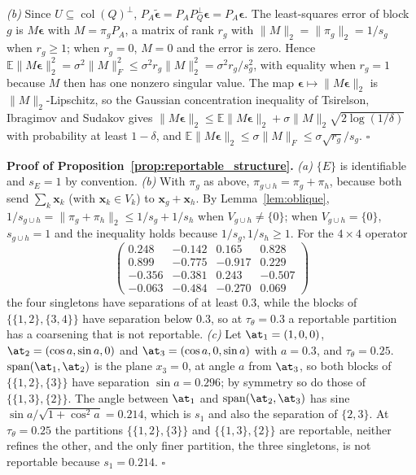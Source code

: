 \emph{(b)}  Since \(U\subseteq\operatorname{col}(Q)^\perp\),
\(P_A\widetilde{\boldsymbol\epsilon}=P_AP_Q^\perp\boldsymbol\epsilon
=P_A\boldsymbol\epsilon\).  The least-squares error of block \(g\) is
\(M\boldsymbol\epsilon\) with \(M=\pi_gP_A\), a matrix of rank \(r_g\) with
\(\|M\|_2=\|\pi_g\|_2=1/s_g\) when \(r_g\ge1\); when \(r_g=0\), \(M=0\) and the
error is zero.  Hence
\(\mathbb E\|M\boldsymbol\epsilon\|_2^2=\sigma^2\|M\|_F^2\le\sigma^2r_g\|M\|_2^2
=\sigma^2r_g/s_g^2\), with equality when \(r_g=1\) because \(M\) then has one nonzero
singular value.  The map \(\boldsymbol\epsilon\mapsto\|M\boldsymbol\epsilon\|_2\) is
\(\|M\|_2\)-Lipschitz, so the Gaussian concentration inequality of
Tsirelson, Ibragimov and Sudakov \citep{boucheron2013concentration} gives
\(\|M\boldsymbol\epsilon\|_2\le\mathbb E\|M\boldsymbol\epsilon\|_2
+\sigma\|M\|_2\sqrt{2\log(1/\delta)}\) with probability at least \(1-\delta\), and
\(\mathbb E\|M\boldsymbol\epsilon\|_2\le\sigma\|M\|_F\le\sigma\sqrt{r_g}/s_g\).
\(\square\)

\noindent\textbf{Proof of Proposition~\ref{prop:reportable_structure}.}
\emph{(a)}  \(\{E\}\) is identifiable and \(s_E=1\) by convention.
\emph{(b)}  With \(\pi_g\) as above, \(\pi_{g\cup h}=\pi_g+\pi_h\), because both send
\(\sum_k\mathbf x_k\) (with \(\mathbf x_k\in V_k\)) to \(\mathbf x_g+\mathbf x_h\).  By
Lemma~\ref{lem:oblique},
\(1/s_{g\cup h}=\|\pi_g+\pi_h\|_2\le1/s_g+1/s_h\) when \(V_{g\cup h}\ne\{0\}\); when
\(V_{g\cup h}=\{0\}\), \(s_{g\cup h}=1\) and the inequality holds because
\(1/s_g,1/s_h\ge1\).  For the \(4\times4\) operator
\[
\begin{pmatrix}
0.248&-0.142&0.165&0.828\\
0.899&-0.775&-0.917&0.229\\
-0.356&-0.381&0.243&-0.507\\
-0.063&-0.484&-0.270&0.069
\end{pmatrix}
\]
the four singletons have separations of at least \(0.3\), while the blocks of
\(\{\{1,2\},\{3,4\}\}\) have separation below \(0.3\), so at \(\tau_\theta=0.3\) a
reportable partition has a coarsening that is not reportable.
\emph{(c)}  Let \(\at_1=(1,0,0)\), \(\at_2=(\cos a,\sin a,0)\) and
\(\at_3=(\cos a,0,\sin a)\) with \(a=0.3\), and \(\tau_\theta=0.25\).
\(\operatorname{span}(\at_1,\at_2)\) is the plane \(x_3=0\), at angle
\(a\) from \(\at_3\), so both blocks of \(\{\{1,2\},\{3\}\}\) have separation
\(\sin a=0.296\); by symmetry so do those of \(\{\{1,3\},\{2\}\}\).  The angle
between \(\at_1\) and \(\operatorname{span}(\at_2,\at_3)\) has sine
\(\sin a/\sqrt{1+\cos^2a}=0.214\), which is \(s_1\) and also the separation of
\(\{2,3\}\).  At \(\tau_\theta=0.25\) the partitions \(\{\{1,2\},\{3\}\}\) and
\(\{\{1,3\},\{2\}\}\) are reportable, neither refines the other, and the only finer
partition, the three singletons, is not reportable because \(s_1=0.214\).  \(\square\)

